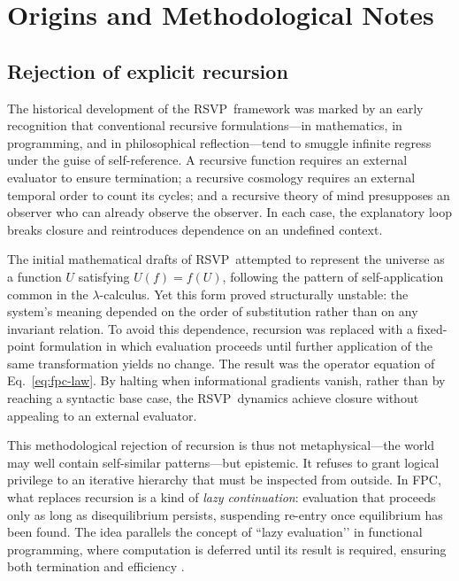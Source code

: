 \documentclass[12pt,a4paper]{article}
\newcommand{\RSVP}{RSVP}              %
\theoremstyle{plain}
\begin{document}
\section{Origins and Methodological Notes}
\label{sec:origins}

\subsection{Rejection of explicit recursion}
The historical development of the \RSVP\ framework was marked by an early recognition that conventional recursive formulations---in mathematics, in programming, and in philosophical reflection---tend to smuggle infinite regress under the guise of self-reference.  A recursive function requires an external evaluator to ensure termination; a recursive cosmology requires an external temporal order to count its cycles; and a recursive theory of mind presupposes an observer who can already observe the observer.  In each case, the explanatory loop breaks closure and reintroduces dependence on an undefined context.

The initial mathematical drafts of \RSVP\ attempted to represent the universe as a function \(U\) satisfying \(U(f)=f(U)\), following the pattern of self-application common in the $\lambda$-calculus.  Yet this form proved structurally unstable: the system’s meaning depended on the order of substitution rather than on any invariant relation.  To avoid this dependence, recursion was replaced with a fixed-point formulation in which evaluation proceeds until further application of the same transformation yields no change.  The result was the operator equation of Eq.~\eqref{eq:fpc-law}.  By halting when informational gradients vanish, rather than by reaching a syntactic base case, the \RSVP\ dynamics achieve closure without appealing to an external evaluator.

This methodological rejection of recursion is thus not metaphysical---the world may well contain self-similar patterns---but epistemic.  It refuses to grant logical privilege to an iterative hierarchy that must be inspected from outside.  In FPC, what replaces recursion is a kind of \emph{lazy continuation}: evaluation that proceeds only as long as disequilibrium persists, suspending re-entry once equilibrium has been found.  The idea parallels the concept of “lazy evaluation’’ in functional programming, where computation is deferred until its result is required, ensuring both termination and efficiency \citep{barendregt1984lambda,perlis1982programs}.
\end{document}
